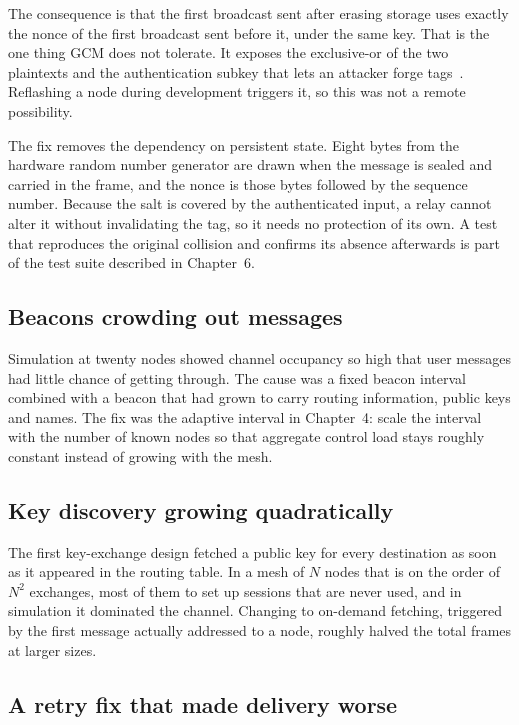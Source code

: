 \documentclass[12pt,a4paper,oneside]{report}
\begin{document}
The consequence is that the first broadcast sent after erasing storage uses
exactly the nonce of the first broadcast sent before it, under the same key.
That is the one thing GCM does not tolerate. It exposes the exclusive-or of the
two plaintexts and the authentication subkey that lets an attacker forge
tags~\cite{dworkin2007gcm}. Reflashing a node during development triggers it, so
this was not a remote possibility.

The fix removes the dependency on persistent state. Eight bytes from the hardware
random number generator are drawn when the message is sealed and carried in the
frame, and the nonce is those bytes followed by the sequence number. Because the
salt is covered by the authenticated input, a relay cannot alter it without
invalidating the tag, so it needs no protection of its own. A test that
reproduces the original collision and confirms its absence afterwards is part of
the test suite described in Chapter~6.

\subsection{Beacons crowding out messages}

Simulation at twenty nodes showed channel occupancy so high that user messages
had little chance of getting through. The cause was a fixed beacon interval
combined with a beacon that had grown to carry routing information, public keys
and names. The fix was the adaptive interval in Chapter~4: scale the interval
with the number of known nodes so that aggregate control load stays roughly
constant instead of growing with the mesh.

\subsection{Key discovery growing quadratically}

The first key-exchange design fetched a public key for every destination as soon
as it appeared in the routing table. In a mesh of $N$ nodes that is on the order
of $N^2$ exchanges, most of them to set up sessions that are never used, and in
simulation it dominated the channel. Changing to on-demand fetching, triggered by
the first message actually addressed to a node, roughly halved the total frames
at larger sizes.

\subsection{A retry fix that made delivery worse}
\end{document}
